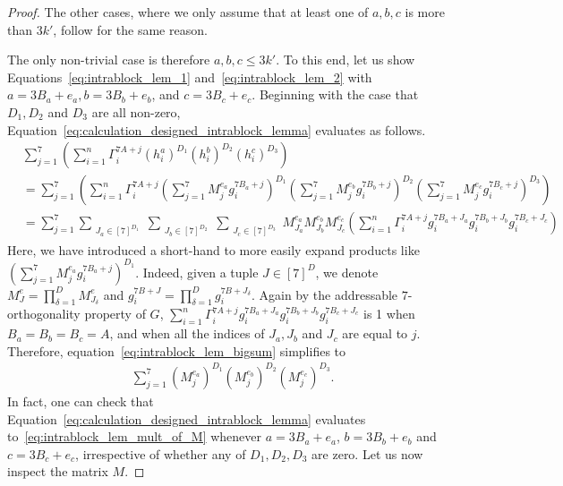 \documentclass[10pt,a4paper]{amsart}
\renewcommand{\leq}{\leqslant}
\begin{document}
\begin{proof}
    The other cases, where we only assume that at least one of $a,b,c$ is more than $3k'$, follow for the same reason.

    The only non-trivial case is therefore $a,b,c \leq 3k'$. To this end, let us show Equations~\eqref{eq:intrablock_lem_1} and~\eqref{eq:intrablock_lem_2} with $a = 3B_a + e_a, b = 3B_b + e_b$, and $c = 3B_c + e_c$. 
    Beginning with the case that $D_1, D_2$ and $D_3$ are all non-zero, Equation~\eqref{eq:calculation_designed_intrablock_lemma} evaluates as follows. 
    \begin{align}
        &\sum_{j=1}^7 \left(\sum_{i=1}^n \Gamma^{7A+j}_i (h^{a}_i)^{D_1} (h^b_i)^{D_2}(h^c_i)^{D_3}\right) \\
        &= \sum_{j=1}^7 \left(\sum_{i=1}^n \Gamma^{7A+j}_i 
        \left(\sum_{j=1}^7 M^{e_a}_{j} g^{7B_a+j}_i \right)^{D_1} 
        \left(\sum_{j=1}^7 M^{e_b}_{j} g^{7B_b+j}_i \right)^{D_2} 
        \left(\sum_{j=1}^7 M^{e_c}_{j} g^{7B_c+j}_i \right)^{D_3}
        \right) \\
        &= \sum_{j=1}^7 
        \sum_{\substack{J_a\in [7]^{D_1}}}
        \sum_{\substack{J_b\in [7]^{D_2}}}
        \sum_{\substack{J_c\in [7]^{D_3}}}
        M^{e_a}_{J_a}M^{e_b}_{J_b}M^{e_c}_{J_c}
        \left(
        \sum_{i=1}^n \Gamma^{7A+j}_i g_i^{7B_a + J_a}g_i^{7B_b + J_b} g_i^{7B_c + J_c} \right) \label{eq:intrablock_lem_bigsum}
    \end{align}
    Here, we have introduced a short-hand to more easily expand products like $\left(\sum_{j=1}^7M_j^{e_a}g_i^{7B_a+j}\right)^{D_1}$. Indeed, given a tuple $J\in [7]^D$, we denote $M^e_J = \prod_{\delta = 1}^D M^e_{J_\delta}$ and $g^{7B+J}_i = \prod_{\delta = 1}^D g^{7B + J_\delta}_i$.
    Again by the addressable $7$-orthogonality property of $G$, $\sum_{i=1}^n \Gamma^{7A+j}_i g_i^{7B_a + J_a}g_i^{7B_b + J_b} g_i^{7B_c + J_c}$ is 1 when $B_a = B_b = B_c = A$, and when all the indices of $J_a, J_b$ and $J_c$ are equal to $j$.
    Therefore, equation~\eqref{eq:intrablock_lem_bigsum} simplifies to
    \begin{align}
        \sum_{j=1}^7 
        (M^{e_a}_{j})^{D_1} (M^{e_b}_{j})^{D_2} (M^{e_c}_{j})^{D_3}.
        \label{eq:intrablock_lem_mult_of_M}
    \end{align}
    In fact, one can check that Equation~\eqref{eq:calculation_designed_intrablock_lemma} evaluates to~\eqref{eq:intrablock_lem_mult_of_M} whenever $a=3B_a+e_a$, $b=3B_b+e_b$ and $c=3B_c+e_c$, irrespective of whether any of $D_1, D_2, D_3$ are zero.
    Let us now inspect the matrix $M$. 

\end{proof}
\end{document}
